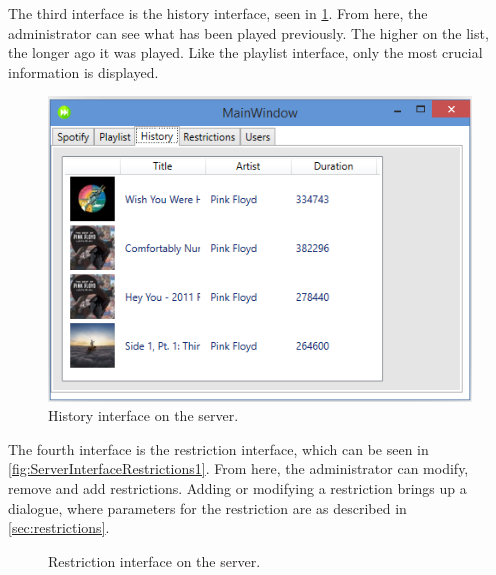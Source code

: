 The third interface is the history interface, seen in \cref{fig:ServerInterfaceHistory}. From here, the administrator can see what has been played previously. The higher on the list, the longer ago it was played. Like the playlist interface, only the most crucial information is displayed. 

\begin{figure}[hbtp]
  \centering
  \includegraphics[width=\textwidth]{Images/ServerInterfaceHistory.png}
  \caption{History interface on the server.}\label{fig:ServerInterfaceHistory}
\end{figure}

The fourth interface is the restriction interface, which can be seen in \cref{fig:ServerInterfaceRestrictions1}. From here, the administrator can modify, remove and add restrictions. Adding or modifying a restriction brings up a dialogue, where parameters for the restriction are as described in \cref{sec:restrictions}.

\begin{figure}[H]
  \centering
  \caption{Restriction interface on the server.}
\end{figure}

